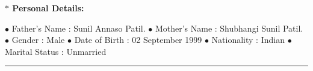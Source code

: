 \documentclass[a4paper,11pt]{article} %
\begin{document}
			\textbf{\large $\ast$ Personal Details:\medskip}{
			
			$\bullet$ Father's Name : Sunil Annaso Patil.\newline
			$\bullet$ Mother's Name : Shubhangi Sunil Patil.\newline
			$\bullet$ Gender : Male \newline
			$\bullet$ Date of Birth : 02 September 1999 \newline
			$\bullet$ Nationality : Indian \newline
			$\bullet$ Marital Status : Unmarried \newline
			
			}




\hrule	
\bigskip
\end{document}
